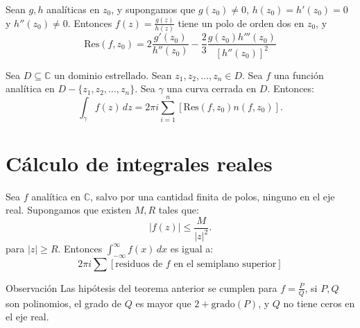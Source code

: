\documentclass[spanish,presentation]{beamer}
\begin{document}
\begin{frame}[label=sec-1-3]{}
\begin{theorem}
Sean \(g,h\) analíticas en \(z_{0}\), y supongamos que
\(g(z_{0})\ne 0\), \(h(z_{0})=h'(z_{0})=0\) y \(h''(z_{0})\ne
    0\). Entonces \(f(z)=\frac{g(z)}{h(z)}\) tiene un polo de orden dos en
\(z_{0}\), y
\begin{displaymath}
\mathrm{Res}(f,z_{0})=2\frac{g'(z_{0})}{h''(z_{0})}-\frac{2}{3}\frac{g(z_{0})h'''(z_{0})}{[h''(z_{0})]^2}
\end{displaymath}    
\end{theorem}
\end{frame}

\begin{frame}[label=sec-1-4]{}
\begin{theorem}
Sea \(D\subseteq \mathbb{C}\) un dominio estrellado. Sean
\(z_{1}, z_{2},\ldots,z_{n}\in D\). Sea \(f\) una función
analítica en \(D-\{z_{1}, z_{2},\ldots,z_{n}\}\). Sea \(\gamma\)
una curva cerrada en \(D\). Entonces:
\begin{displaymath}
\int_{\gamma}f(z)\,dz=2\pi i\sum_{i=1}^{n}[\mathrm{Res}(f,z_{0})n(f,z_{0})].
\end{displaymath}
\end{theorem}
\end{frame}

\section{Cálculo de integrales reales}
\label{orgheadline1}

\begin{frame}[label=sec-2-1]{}
\begin{theorem}
Sea \(f\) analítica en \(\mathbb{C}\), salvo por una cantidad
finita de polos, ninguno en el eje real. Supongamos que existen
\(M,R\) tales que:
\begin{displaymath}
|f(z)| \leq \frac{M}{|z|^2}.
\end{displaymath}
para \(|z|\geq R\). Entonces \(\int_{-\infty}^{\infty}f(x)\,dx\)
es igual a:
\begin{displaymath}
2\pi i\sum [\text{residuos de \(f\) en el semiplano superior}]
\end{displaymath}
\end{theorem}

\begin{block}{Observación}
Las hipótesis del teorema anterior se cumplen para
\(f=\frac{P}{Q}\), si \(P,Q\) son polinomios, el grado de \(Q\) es
mayor que \(2+\mathrm{grado}(P)\), y \(Q\) no tiene ceros en el
eje real.
\end{block}
\end{frame}
\end{document}
